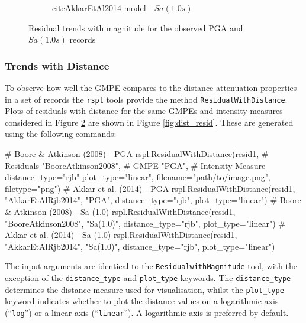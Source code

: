 \begin{figure}[htb]
\begin{subfigure}[b]{0.49\textwidth}
     \caption{citeAkkarEtAl2014 model - $Sa \left( {1.0 s} \right)$}
      \label{fig:sa1_mag_akkar2014}
  \end{subfigure}
  \caption{Residual trends with magnitude for the observed PGA and $Sa \left( {1.0 s} \right)$ records}
  \label{fig:mag_resid}
\end{figure}


\subsubsection{Trends with Distance}

To observe how well the GMPE compares to the distance attenuation properties in a set of records the \verb=rspl= tools provide the method \verb=ResidualWithDistance=. Plots of residuals with distance for the same GMPEs and intensity measures considered in Figure \ref{fig:mag_resid} are shown in Figure \ref{fig:dist_resid}. These are generated using the following commands:

\begin{python}[frame=single]
# Boore & Atkinson (2008)  - PGA
rspl.ResidualWithDistance(resid1,  # Residuals
                           "BooreAtkinson2008",  # GMPE
                           "PGA",   # Intensity Measure
                           distance_type="rjb"
                           plot_type="linear",
                           filename="path/to/image.png",
                           filetype="png")
# Akkar et al. (2014)  - PGA
rspl.ResidualWithDistance(resid1, "AkkarEtAlRjb2014",
                          "PGA", distance_type="rjb",
                          plot_type="linear") 
# Boore & Atkinson (2008)  - Sa (1.0)
rspl.ResidualWithDistance(resid1, "BooreAtkinson2008",
                          "Sa(1.0)", distance_type="rjb",
                          plot_type="linear") 
# Akkar et al. (2014)  - Sa (1.0)
rspl.ResidualWithDistance(resid1, "AkkarEtAlRjb2014",
                          "Sa(1.0)", distance_type="rjb",
                          plot_type="linear")                         
\end{python}

The input arguments are identical to the \verb=ResidualwithMagnitude= tool, with the exception of the \verb=distance_type= and \verb=plot_type= keywords. The \verb=distance_type= determines the distance measure used for visualisation, whilst the \verb=plot_type= keyword indicates whether to plot the distance values on a logarithmic axis (``\verb=log='') or a linear axis (``\verb=linear=''). A logarithmic axis is preferred by default.

